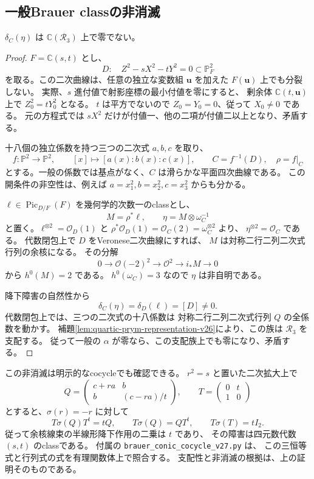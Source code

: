 \subsection{一般Brauer classの非消滅}
\begin{lemma}[非分裂二次曲線からの支配族]
\label{lem:prym-brauer-nonzero-v27}
$\delta_C(\eta)$ は $\mathbb C(\mathcal R_3)$ 上で零でない。
\end{lemma}

\begin{proof}
$F=\mathbb C(s,t)$ とし、
\[
 D:\quad Z^2-sX^2-tY^2=0\subset\mathbb P^2_F
\]
を取る。この二次曲線は、任意の独立な変数組 $\mathbf u$ を加えた
$F(\mathbf u)$ 上でも分裂しない。
実際、$s$ 進付値で射影座標の最小付値を零にすると、
剰余体 $\mathbb C(t,\mathbf u)$ 上で $Z_0^2=tY_0^2$ となる。
$t$ は平方でないので $Z_0=Y_0=0$、従って $X_0\ne0$ である。
元の方程式では $sX^2$ だけが付値一、他の二項が付値二以上となり、矛盾する。

十八個の独立係数を持つ三つの二次式 $a,b,c$ を取り、
\[
 f:\mathbb P^2\longrightarrow\mathbb P^2,
 \qquad [x]\longmapsto[a(x):b(x):c(x)],
 \qquad C=f^{-1}(D),\quad\rho=f|_C
\]
とする。一般の係数では基点がなく、$C$ は滑らかな平面四次曲線である。
この開条件の非空性は、例えば $a=x_1^2,b=x_2^2,c=x_3^2$ からも分かる。

$\ell\in\operatorname{Pic}_{D/F}(F)$ を幾何学的次数一のclassとし、
\[
 M=\rho^*\ell,
 \qquad \eta=M\otimes\omega_C^{-1}
\]
と置く。$\ell^{\otimes2}=\mathcal O_D(1)$ と
$\rho^*\mathcal O_D(1)=\mathcal O_C(2)=\omega_C^{\otimes2}$ より、
$\eta^{\otimes2}=\mathcal O_C$ である。
代数閉包上で $D$ をVeronese二次曲線にすれば、
$M$ は対称二行二列二次式行列の余核になる。
その分解
\[
 0\longrightarrow\mathcal O(-2)^2
 \longrightarrow\mathcal O^2\longrightarrow i_*M\longrightarrow0
\]
から $h^0(M)=2$ である。
$h^0(\omega_C)=3$ なので $\eta$ は非自明である。

降下障害の自然性から
\[
 \delta_C(\eta)=\delta_D(\ell)=[D]\ne0.
\]
代数閉包上では、三つの二次式の十八係数は
対称二行二列二次式行列 $Q$ の全係数を動かす。
補題\ref{lem:quartic-prym-representation-v26}により、この族は
$\mathcal R_3$ を支配する。
従って一般の $\alpha$ が零なら、この支配族上でも零になり、矛盾する。
\end{proof}

この非消滅は明示的なcocycleでも確認できる。
$r^2=s$ と置いた二次拡大上で
\[
 Q=\begin{pmatrix}c+ra&b\\ b&(c-ra)/t\end{pmatrix},
 \qquad T=\begin{pmatrix}0&t\\1&0\end{pmatrix}
\]
とすると、$\sigma(r)=-r$ に対して
\[
 T\sigma(Q)T^t=tQ,\qquad T\sigma(Q)=QT^t,
 \qquad T\sigma(T)=tI_2.
\]
従って余核線束の半線形降下作用の二乗は $t$ であり、
その障害は四元数代数 $(s,t)$ のclassである。
付属の \nolinkurl{brauer_conic_cocycle_v27.py} は、
この三恒等式と行列式の式を有理関数体上で照合する。
支配性と非消滅の根拠は、上の証明そのものである。

